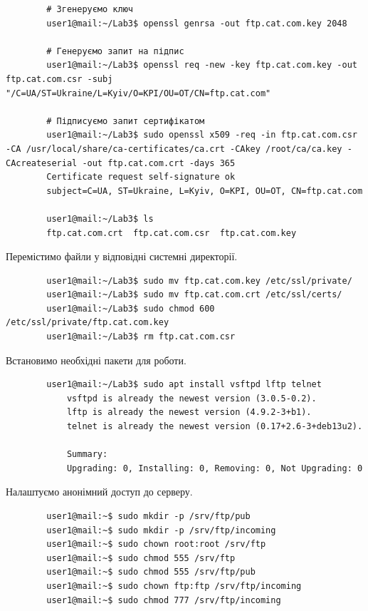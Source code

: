 \documentclass[14pt, a4paper]{extreport}
\begin{document}
	\begin{verbatim}
		# Згенеруємо ключ
		user1@mail:~/Lab3$ openssl genrsa -out ftp.cat.com.key 2048
		
		# Генеруємо запит на підпис
		user1@mail:~/Lab3$ openssl req -new -key ftp.cat.com.key -out ftp.cat.com.csr -subj "/C=UA/ST=Ukraine/L=Kyiv/O=KPI/OU=OT/CN=ftp.cat.com"
		
		# Підписуємо запит сертифікатом
		user1@mail:~/Lab3$ sudo openssl x509 -req -in ftp.cat.com.csr -CA /usr/local/share/ca-certificates/ca.crt -CAkey /root/ca/ca.key -CAcreateserial -out ftp.cat.com.crt -days 365
		Certificate request self-signature ok
		subject=C=UA, ST=Ukraine, L=Kyiv, O=KPI, OU=OT, CN=ftp.cat.com
		
		user1@mail:~/Lab3$ ls
		ftp.cat.com.crt  ftp.cat.com.csr  ftp.cat.com.key
	\end{verbatim}
	
	Перемістимо файли у відповідні системні директорії.
	
	\begin{verbatim}
		user1@mail:~/Lab3$ sudo mv ftp.cat.com.key /etc/ssl/private/
		user1@mail:~/Lab3$ sudo mv ftp.cat.com.crt /etc/ssl/certs/
		user1@mail:~/Lab3$ sudo chmod 600 /etc/ssl/private/ftp.cat.com.key
		user1@mail:~/Lab3$ rm ftp.cat.com.csr 
	\end{verbatim}
	
	Встановимо необхідні пакети для роботи.
	
	\begin{verbatim}
		user1@mail:~/Lab3$ sudo apt install vsftpd lftp telnet
			vsftpd is already the newest version (3.0.5-0.2).
			lftp is already the newest version (4.9.2-3+b1).
			telnet is already the newest version (0.17+2.6-3+deb13u2).
			
			Summary:
			Upgrading: 0, Installing: 0, Removing: 0, Not Upgrading: 0
	\end{verbatim}
	
	\pagebreak
	
	Налаштуємо анонімний доступ до серверу.
	
	\begin{verbatim}
		user1@mail:~$ sudo mkdir -p /srv/ftp/pub
		user1@mail:~$ sudo mkdir -p /srv/ftp/incoming 
		user1@mail:~$ sudo chown root:root /srv/ftp
		user1@mail:~$ sudo chmod 555 /srv/ftp
		user1@mail:~$ sudo chmod 555 /srv/ftp/pub
		user1@mail:~$ sudo chown ftp:ftp /srv/ftp/incoming
		user1@mail:~$ sudo chmod 777 /srv/ftp/incoming
	\end{verbatim}
	
\end{document}
